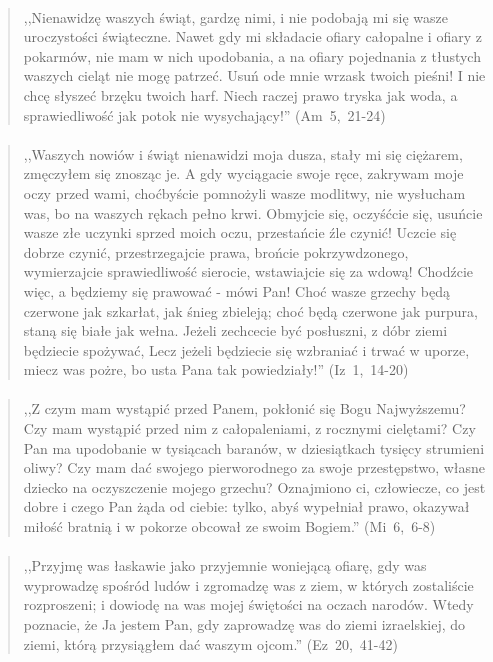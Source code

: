 \documentclass[10pt,a4paper,oneside]{article}
\begin{document}
\paragraph{}
\begin{quote}
,,Nienawidzę waszych świąt, gardzę nimi, i nie podobają mi się wasze uroczystości świąteczne. Nawet gdy mi składacie ofiary całopalne i ofiary z pokarmów, nie mam w nich upodobania, a na ofiary pojednania z tłustych waszych cieląt nie mogę patrzeć. Usuń ode mnie wrzask twoich pieśni! I nie chcę słyszeć brzęku twoich harf. Niech raczej prawo tryska jak woda, a sprawiedliwość jak potok nie wysychający!'' \mbox{(Am 5, 21-24)}
\end{quote}
\paragraph{}
\begin{quote}
,,Waszych nowiów i świąt nienawidzi moja dusza, stały mi się ciężarem, zmęczyłem się znosząc je. A gdy wyciągacie swoje ręce, zakrywam moje oczy przed wami, choćbyście pomnożyli wasze modlitwy, nie wysłucham was, bo na waszych rękach pełno krwi. Obmyjcie się, oczyśćcie się, usuńcie wasze złe uczynki sprzed moich oczu, przestańcie źle czynić! Uczcie się dobrze czynić, przestrzegajcie prawa, brońcie pokrzywdzonego, wymierzajcie sprawiedliwość sierocie, wstawiajcie się za wdową! Chodźcie więc, a będziemy się prawować - mówi Pan! Choć wasze grzechy będą czerwone jak szkarłat, jak śnieg zbieleją; choć będą czerwone jak purpura, staną się białe jak wełna. Jeżeli zechcecie być posłuszni, z dóbr ziemi będziecie spożywać, Lecz jeżeli będziecie się wzbraniać i trwać w uporze, miecz was pożre, bo usta Pana tak powiedziały!'' \mbox{(Iz 1, 14-20)}
\end{quote}
\paragraph{}
\begin{quote}
,,Z czym mam wystąpić przed Panem, pokłonić się Bogu Najwyższemu? Czy mam wystąpić przed nim z całopaleniami, z rocznymi cielętami? Czy Pan ma upodobanie w tysiącach baranów, w dziesiątkach tysięcy strumieni oliwy? Czy mam dać swojego pierworodnego za swoje przestępstwo, własne dziecko na oczyszczenie mojego grzechu? Oznajmiono ci, człowiecze, co jest dobre i czego Pan żąda od ciebie: tylko, abyś wypełniał prawo, okazywał miłość bratnią i w pokorze obcował ze swoim Bogiem.'' \mbox{(Mi 6, 6-8)}
\end{quote}
\paragraph{}
\begin{quote}
,,Przyjmę was łaskawie jako przyjemnie woniejącą ofiarę, gdy was wyprowadzę spośród ludów i zgromadzę was z ziem, w których zostaliście rozproszeni; i dowiodę na was mojej świętości na oczach narodów. Wtedy poznacie, że Ja jestem Pan, gdy zaprowadzę was do ziemi izraelskiej, do ziemi, którą przysiągłem dać waszym ojcom.'' \mbox{(Ez 20, 41-42)}
\end{quote}
\end{document}

